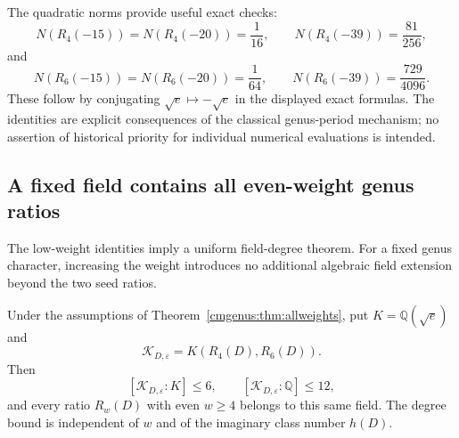 The quadratic norms provide useful exact checks:
\[
 N(R_4(-15))=N(R_4(-20))=\frac1{16},\qquad
 N(R_4(-39))=\frac{81}{256},
\]
and
\[
 N(R_6(-15))=N(R_6(-20))=\frac1{64},\qquad
 N(R_6(-39))=\frac{729}{4096}.
\]
These follow by conjugating $\sqrt e\mapsto-\sqrt e$ in the displayed
exact formulas. The identities are explicit consequences of the
classical genus-period mechanism; no assertion of historical priority
for individual numerical evaluations is intended.


\subsection{A fixed field contains all even-weight genus ratios}

The low-weight identities imply a uniform field-degree theorem.
For a fixed genus character, increasing the weight introduces no
additional algebraic field extension beyond the two seed ratios.

\begin{theorem}
\label{cmgenus:thm:degree}
Under the assumptions of Theorem~\ref{cmgenus:thm:allweights}, put
$K=\mathbb Q(\sqrt e)$ and
\[
 \mathcal K_{D,\varepsilon}=K(R_4(D),R_6(D)).
\]
Then
\[
 [\mathcal K_{D,\varepsilon}:K]\leq6,
 \qquad [\mathcal K_{D,\varepsilon}:\mathbb Q]\leq12,
\]
and every ratio $R_w(D)$ with even $w\geq4$ belongs to this
same field. The degree bound is independent of $w$ and of the imaginary
class number $h(D)$.
\end{theorem}

